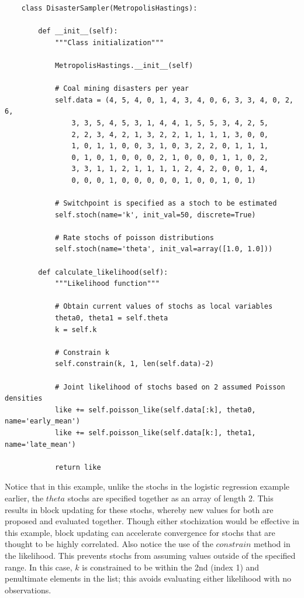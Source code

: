 \documentclass[]{book}
\begin{document}
\begin{verbatim}
    class DisasterSampler(MetropolisHastings):

        def __init__(self):
            """Class initialization"""

            MetropolisHastings.__init__(self)

            # Coal mining disasters per year
            self.data = (4, 5, 4, 0, 1, 4, 3, 4, 0, 6, 3, 3, 4, 0, 2, 6,
                3, 3, 5, 4, 5, 3, 1, 4, 4, 1, 5, 5, 3, 4, 2, 5,
                2, 2, 3, 4, 2, 1, 3, 2, 2, 1, 1, 1, 1, 3, 0, 0,
                1, 0, 1, 1, 0, 0, 3, 1, 0, 3, 2, 2, 0, 1, 1, 1,
                0, 1, 0, 1, 0, 0, 0, 2, 1, 0, 0, 0, 1, 1, 0, 2,
                3, 3, 1, 1, 2, 1, 1, 1, 1, 2, 4, 2, 0, 0, 1, 4,
                0, 0, 0, 1, 0, 0, 0, 0, 0, 1, 0, 0, 1, 0, 1)

            # Switchpoint is specified as a stoch to be estimated
            self.stoch(name='k', init_val=50, discrete=True)

            # Rate stochs of poisson distributions
            self.stoch(name='theta', init_val=array([1.0, 1.0]))

        def calculate_likelihood(self):
            """Likelihood function"""

            # Obtain current values of stochs as local variables
            theta0, theta1 = self.theta
            k = self.k

            # Constrain k
            self.constrain(k, 1, len(self.data)-2)

            # Joint likelihood of stochs based on 2 assumed Poisson densities
            like += self.poisson_like(self.data[:k], theta0, name='early_mean')
            like += self.poisson_like(self.data[k:], theta1, name='late_mean')

            return like
\end{verbatim}
Notice that in this example, unlike the stochs in the logistic regression example earlier, the $theta$ stochs are specified together as an array of length 2. This results in block updating for these stochs, whereby new values for both are proposed and evaluated together. Though either stochization would be effective in this example, block updating can accelerate convergence for stochs that are thought to be highly correlated. Also notice the use of the $constrain$ method in the likelihood. This prevents stochs from assuming values outside of the specified range. In this case, $k$ is constrained to be within the 2nd (index 1) and penultimate elements in the list; this avoids evaluating either likelihood with no observations.
\end{document}
